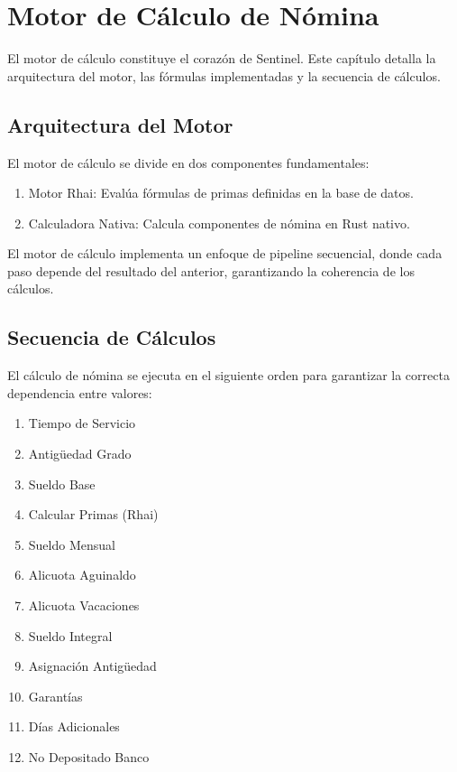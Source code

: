 \chapter{Motor de Cálculo de Nómina}

\bigskip

El motor de cálculo constituye el corazón de Sentinel. Este capítulo detalla la arquitectura del motor, las fórmulas implementadas y la secuencia de cálculos.

\bigskip

\section{Arquitectura del Motor}

El motor de cálculo se divide en dos componentes fundamentales:

\bigskip

\begin{enumerate}
    \item Motor Rhai: Evalúa fórmulas de primas definidas en la base de datos.
    \item Calculadora Nativa: Calcula componentes de nómina en Rust nativo.
\end{enumerate}

\bigskip

El motor de cálculo implementa un enfoque de pipeline secuencial, donde cada paso depende del resultado del anterior, garantizando la coherencia de los cálculos.

\bigskip

\section{Secuencia de Cálculos}

El cálculo de nómina se ejecuta en el siguiente orden para garantizar la correcta dependencia entre valores:

\bigskip

\begin{enumerate}
    \item Tiempo de Servicio
    \item Antigüedad Grado
    \item Sueldo Base
    \item Calcular Primas (Rhai)
    \item Sueldo Mensual
    \item Alicuota Aguinaldo
    \item Alicuota Vacaciones
    \item Sueldo Integral
    \item Asignación Antigüedad
    \item Garantías
    \item Días Adicionales
    \item No Depositado Banco
\end{enumerate}

